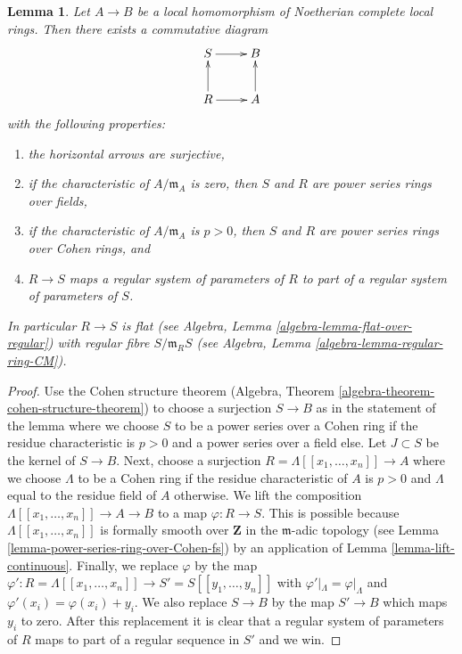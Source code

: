 \documentclass[10pt,a4paper]{amsart}
\theoremstyle{plain}
\newtheorem{lemma}[subsection]{Lemma}
\theoremstyle{definition}
\theoremstyle{remark}
\numberwithin{equation}{subsection}
\begin{document}
\begin{lemma}
\label{lemma-embed-map-Noetherian-complete-local-rings}
Let $A \to B$ be a local homomorphism of Noetherian complete local rings.
Then there exists a commutative diagram
$$
\xymatrix{
S \ar[r] & B \\
R \ar[u] \ar[r] & A \ar[u]
}
$$
with the following properties:
\begin{enumerate}
\item the horizontal arrows are surjective,
\item if the characteristic of $A/\mathfrak m_A$ is zero, then $S$ and $R$
are power series rings over fields,
\item if the characteristic of $A/\mathfrak m_A$ is $p > 0$, then $S$ and $R$
are power series rings over Cohen rings, and
\item $R \to S$ maps a regular system of parameters of $R$ to part of a
regular system of parameters of $S$.
\end{enumerate}
In particular $R \to S$ is flat (see Algebra,
Lemma \ref{algebra-lemma-flat-over-regular}) with regular fibre
$S/\mathfrak m_R S$ (see Algebra, Lemma \ref{algebra-lemma-regular-ring-CM}).
\end{lemma}

\begin{proof}
Use the Cohen structure theorem
(Algebra, Theorem \ref{algebra-theorem-cohen-structure-theorem})
to choose a surjection $S \to B$ as in the statement of the lemma
where we choose $S$ to be a power series over a Cohen ring if the
residue characteristic is $p > 0$ and a power series over a field else.
Let $J \subset S$ be the kernel of $S \to B$.
Next, choose a surjection $R = \Lambda[[x_1, \ldots, x_n]] \to A$ where
we choose $\Lambda$ to be a Cohen ring if the residue characteristic of
$A$ is $p > 0$ and $\Lambda$ equal to the residue field of $A$ otherwise.
We lift the composition $\Lambda[[x_1, \ldots, x_n]] \to A \to B$
to a map $\varphi : R \to S$. This is possible because
$\Lambda[[x_1, \ldots, x_n]]$ is formally smooth over $\mathbf{Z}$
in the $\mathfrak m$-adic topology (see
Lemma \ref{lemma-power-series-ring-over-Cohen-fs})
by an application of Lemma \ref{lemma-lift-continuous}.
Finally, we replace $\varphi$ by the map
$\varphi' : R = \Lambda[[x_1, \ldots, x_n]] \to S' = S[[y_1, \ldots, y_n]]$
with $\varphi'|_\Lambda = \varphi|_\Lambda$ and
$\varphi'(x_i) = \varphi(x_i) + y_i$. We also replace $S \to B$
by the map $S' \to B$ which maps $y_i$ to zero. After this replacement
it is clear that a regular system of parameters of $R$ maps to part of a
regular sequence in $S'$ and we win.
\end{proof}
\end{document}
